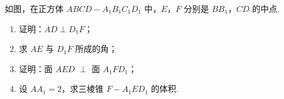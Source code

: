 \documentclass[UTF8,a4paper,oneside,11pt]{ctexbook}
\begin{document}
\begin{problem}
如图，在正方体 \(ABCD - A_{1}B_{1}C_{1}D_{1}\) 中，\(E\)，\(F\) 分别是 \(BB_{1}\)，\(CD\) 的中点.

\begin{enumerate}
\item 证明：\(AD \perp D_{1}F\)；

\item 求 \(AE\) 与 \(D_{1}F\) 所成的角；

\item 证明：面 \(AED\) \(\perp\) 面 \(A_{1}FD_{1}\)；

\item 设 \(AA_{1} = 2\)，求三棱锥 \(F - A_{1}ED_{1}\) 的体积.
\end{enumerate}

\end{problem}
\end{document}
